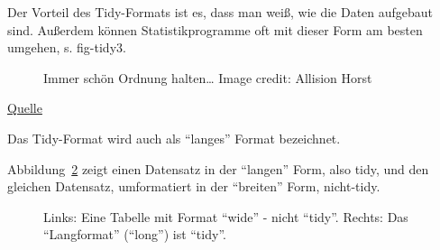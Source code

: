 \documentclass[
  a4paper,
  DIV=11]{scrreprt}
\theoremstyle{definition}
\theoremstyle{definition}
\theoremstyle{definition}
\theoremstyle{remark}
\begin{document}
Der Vorteil des Tidy-Formats ist es, dass man weiß, wie die Daten
aufgebaut sind. Außerdem können Statistikprogramme oft mit dieser Form
am besten umgehen, s. fig-tidy3.

\begin{figure}


\caption{\label{fig-tidy3}Immer schön Ordnung halten\ldots{} Image
credit: Allision Horst}

\end{figure}%

\href{https://github.com/allisonhorst/stats-illustrations}{Quelle}

Das Tidy-Format wird auch als ``langes'' Format bezeichnet.

Abbildung~\ref{fig-long-wide-anim} zeigt einen Datensatz in der
``langen'' Form, also tidy, und den gleichen Datensatz, umformatiert in
der ``breiten'' Form, nicht-tidy.

\begin{figure}


\caption{\label{fig-long-wide-anim}Links: Eine Tabelle mit Format
``wide'' - nicht ``tidy''. Rechts: Das ``Langformat'' (``long'') ist
``tidy''.}

\end{figure}%
\end{document}
